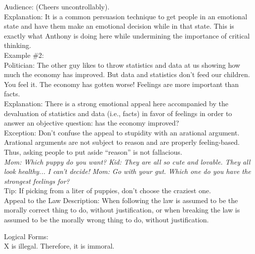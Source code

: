 \documentclass[a4paper,12pt,single,pdftex]{scrartcl}
\begin{document}
    
      Audience: (Cheers uncontrollably).
    \\

    
      Explanation: It is a common persuasion technique to get people in an emotional state and have them make an emotional decision while in that state. This is exactly what Anthony is doing here while undermining the importance of critical thinking.
    \\

    
      Example \#2:
    \\

    
      Politician: The other guy likes to throw statistics and data at us showing how much the economy has improved. But data and statistics don't feed our children. You feel it. The economy has gotten worse! Feelings are more important than facts.
    \\

    
      Explanation: There is a strong emotional appeal here accompanied by the devaluation of statistics and data (i.e., facts) in favor of feelings in order to answer an objective question: has the economy improved?
    \\

    
      Exception: Don’t confuse the appeal to stupidity with an arational argument. Arational arguments are not subject to reason and are properly feeling-based. Thus, asking people to put aside “reason” is not fallacious.
    \\

    
      {\em Mom: Which puppy do you want?} \newline
{\em Kid: They are all so cute and lovable. They all look healthy... I can’t decide!} \newline
{\em Mom: Go with your gut. Which one do you have the strongest feelings for?}
    \\

    
      Tip: If picking from a liter of puppies, don’t choose the craziest one.
    \\

  

Appeal to the Law
    Description: When following the law is assumed to be the morally correct thing to do, without justification, or when breaking the law is assumed to be the morally wrong thing to do, without justification.

    
      Logical Forms:
    \\

    
      X is illegal. Therefore, it is immoral.
    \\
\end{document}
